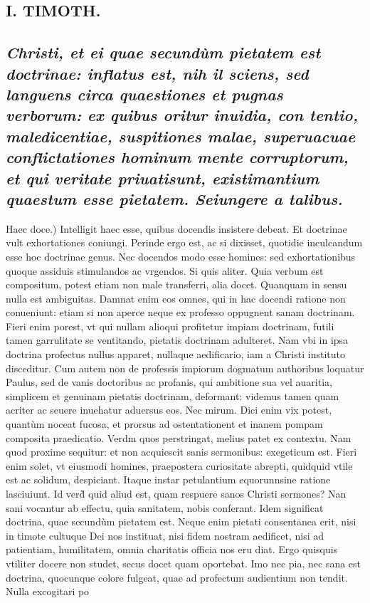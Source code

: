\documentclass{article}
\begin{document}
\begin{pages}
\section*{I. TIMOTH. }
\marginpar{[ p.74 ]}
{}
\subsection*{\textit{Christi, et ei quae secundùm pietatem est doctrinae: inflatus est, nih il sciens, sed languens circa quaestiones et pugnas verborum: ex quibus oritur inuidia, con tentio, maledicentiae, suspitiones malae, superuacuae conflictationes hominum mente corruptorum, et qui veritate priuatisunt, existimantium quaestum esse pietatem. Seiungere a talibus. }}\pstart Haec doce.) Intelligit haec esse, quibus docendis insistere debeat. Et doctrinae vult exhortationes coniungi. Perinde ergo est, ac si dixisset, quotidie inculcandum esse hoc doctrinae genus. Nec docendos modo esse homines: sed exhortationibus quoque assiduis stimulandos ac vrgendos.  \pend\pstart Si quis aliter. Quia verbum est compositum, potest etiam non male transferri, alia docet. Quanquam in sensu nulla est ambiguitas. Damnat enim eos omnes, qui in hac docendi ratione non conueniunt: etiam si non aperce neque ex professo oppugnent sanam doctrinam. Fieri enim porest, vt qui nullam alioqui profitetur impiam doctrinam, futili tamen garrulitate se ventitando, pietatis doctrinam adulteret. Nam vbi in ipsa doctrina profectus nullus apparet, nullaque aedificario, iam a Christi instituto disceditur. Cum autem non de professis impiorum dogmatum authoribus loquatur Paulus, sed de vanis doctoribus ac profanis, qui ambitione sua vel auaritia, simplicem et genuinam pietatis doctrinam, deformant: videmus tamen quam acriter ac seuere inuehatur aduersus eos. Nec mirum. Dici enim vix potest, quantùm noceat fucosa, et prorsus ad ostentationent et inanem pompam composita praedicatio. Verdm quos perstringat, melius patet ex contextu. Nam quod proxime sequitur: et non acquiescit sanis sermonibus: exegeticum est. Fieri enim solet, vt eiusmodi homines, praepostera curiositate abrepti, quidquid vtile est ac solidum, despiciant. Itaque instar petulantium equorunnsine ratione lasciuiunt. Id verd̀ quid aliud est, quam respuere sanos Christi sermones? Nan sani vocantur ab effectu, quia sanitatem, nobis conferant. Idem significat doctrina, quae secundùm pietatem est. Neque enim pietati consentanea erit, nisi in timote cultuque Dei nos instituat, nisi fidem nostram aedificet, nisi ad patientiam, humilitatem, omnia charitatis officia nos eru diat. Ergo quisquis vtiliter docere non studet, secus docet quam oportebat. Imo nec pia, nec sana est doctrina, quocunque colore fulgeat, quae ad profectum audientium non tendit. Nulla excogitari po\pend

\end{pages}
\end{document}
